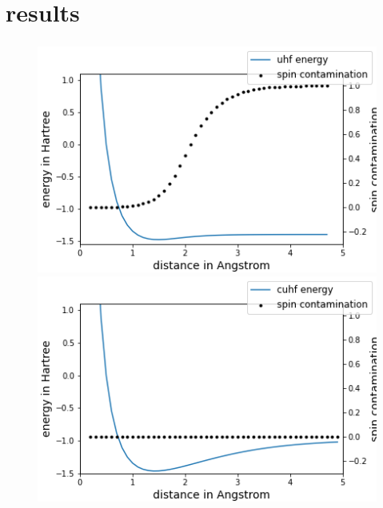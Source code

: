 \documentclass[aspectratio=169]{beamer}
\begin{document}
\section{results}

\begin{frame}
    \frametitle{}
    \begin{figure}
        \begin{minipage}[b]{0.45\linewidth}
            \includegraphics[width=\linewidth]{./figures/h3_uhf_sto-3g.png}
        \end{minipage}
        \begin{minipage}[b]{0.45\linewidth}
            \includegraphics[width=\linewidth]{./figures/h3_cuhf.png}
        \end{minipage}
    \end{figure}

\end{frame}
\end{document}
